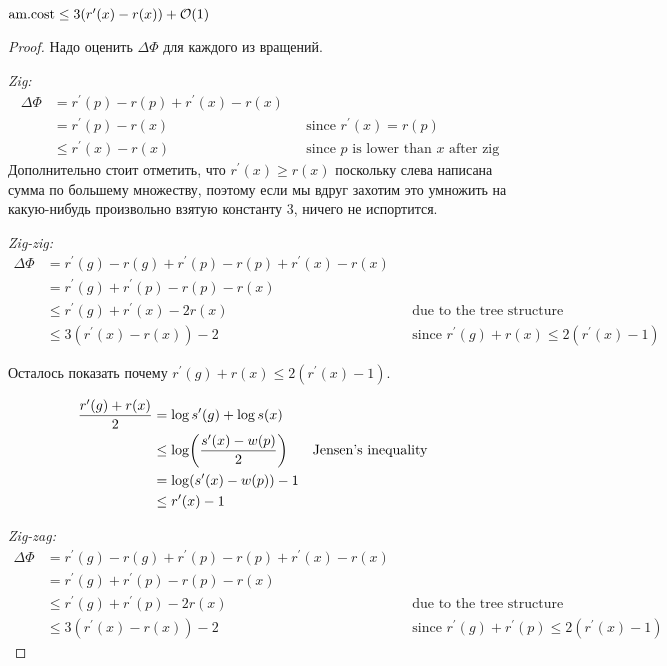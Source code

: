 \begin{theorem}
	$\text{am.cost} \leq 3(r^\prime(x) - r(x)) + \mathcal{O}(1)$
\end{theorem}
\begin{proof}
	Надо оценить $\Delta\Phi$ для каждого из вращений.

	{\it Zig:}
	\begin{align*}
		\Delta\Phi & = r^\prime(p) - r(p) + r^\prime(x) - r(x) \\
		& = r^\prime(p) - r(x) && \text{since $r^\prime(x) = r(p)$} \\
		& \leq r^\prime(x) - r(x) && \text{since $p$ is lower than $x$ after zig}
	\end{align*}
	Дополнительно стоит отметить, что $r^\prime(x) \geq r(x)$ поскольку слева написана сумма по большему множеству, поэтому если мы вдруг захотим это умножить на какую-нибудь произвольно взятую константу $3$, ничего не испортится.

	{\it Zig-zig:}
	\begin{align*}
		\Delta\Phi & = r^\prime(g) - r(g) + r^\prime(p) - r(p) + r^\prime(x) - r(x) \\
		& = r^\prime(g) + r^\prime(p) - r(p) - r(x) \\
		& \leq r^\prime(g) + r^\prime(x) - 2 r(x) && \text{due to the tree structure} \\
		& \leq 3 (r^\prime(x) - r(x)) - 2 && \text{since $r^\prime(g) + r(x) \leq 2(r^\prime(x) - 1)$}
	\end{align*}

	Осталось показать почему $r^\prime(g) + r(x) \leq 2(r^\prime(x) - 1)$.

	\begin{align*}
		\frac{r^\prime(g) + r(x)}{2} & = \log s^\prime(g) + \log s(x) \\
		& \leq \log \parens*{ \frac{s^\prime(x) - w(p)}{2} } && \text{Jensen's inequality} \\
		& = \log \parens*{s^\prime (x) - w(p)} - 1 \\
		& \leq r^\prime(x) - 1
	\end{align*}

	{\it Zig-zag:}
	\begin{align*}
		\Delta\Phi & = r^\prime(g) - r(g) + r^\prime(p) - r(p) + r^\prime(x) - r(x) \\
		& = r^\prime(g) + r^\prime(p) - r(p) - r(x) \\
		& \leq r^\prime(g) + r^\prime(p) - 2 r(x) && \text{due to the tree structure} \\
		& \leq 3 (r^\prime(x) - r(x)) - 2 && \text{since $r^\prime(g) + r^\prime(p) \leq 2(r^\prime(x) - 1)$}
	\end{align*}


\end{proof}
